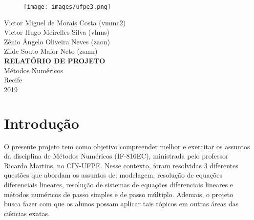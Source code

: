 \documentclass[12pt]{article}%
\begin{document}
\begin{titlepage}
\begin{figure}[t]
\centering
\texttt{[image: images/ufpe3.png]}
\label{fig_ufpe}
\end{figure}
\begin{center} 
{\large Victor Miguel de Morais Costa (vmmc2)}\\[0.2cm]
{\large Victor Hugo Meirelles Silva (vhms)}\\[0.2cm]
{\large Zênio Ângelo Oliveira Neves (zaon)}\\[0.2cm]
{\large Zilde Souto Maior Neto (zsmn)}\\[5.5cm]
{\bf \Large RELATÓRIO DE PROJETO}\\[0.2cm]
{\large Métodos Numéricos}\\[5.5cm]
{\large Recife}\\[0.1cm]
{\large 2019}
\end{center}
\end{titlepage}

\thispagestyle{empty}
\pagebreak
\thispagestyle{empty}
\tableofcontents
\newpage    
\setcounter{page}{1}

\section{Introdução}
    O presente projeto tem como objetivo compreender melhor e exercitar os assuntos da disciplina de Métodos Numéricos (IF-816EC), ministrada pelo professor Ricardo Martins, no CIN-UFPE. Nesse contexto, foram resolvidas 3 diferentes questões que abordam os assuntos de: modelagem, resolução de equações diferenciais lineares, resolução de sistemas de equações diferenciais lineares e métodos numéricos de passo simples e de passo múltiplo. Ademais, o projeto busca fazer com que os alunos possam aplicar tais tópicos em outras áreas das ciências exatas.

\newpage
\end{document}
